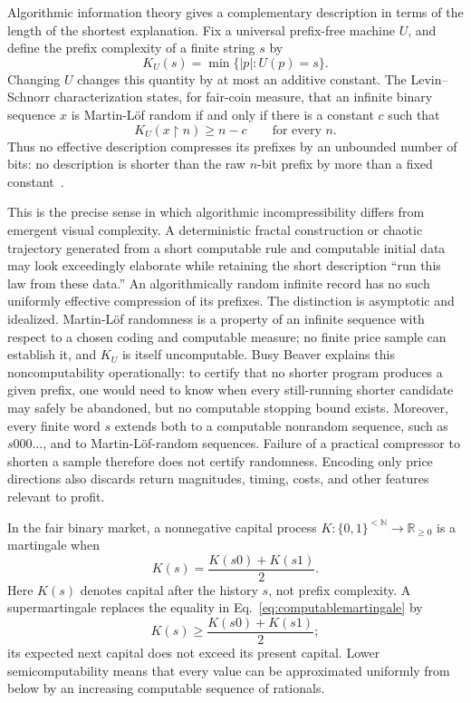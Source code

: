 \documentclass[aps,pra,reprint,superscriptaddress,amsmath,amssymb,floatfix]{revtex4-2}
\theoremstyle{plain}
\theoremstyle{definition}
\theoremstyle{remark}
\begin{document}
Algorithmic information theory gives a complementary description in terms of
the length of the shortest explanation. Fix a universal prefix-free machine
\(U\), and define the prefix complexity of a finite string \(s\) by
\begin{equation}
  K_U(s)=\min\{|p|:U(p)=s\}.
  \label{eq:prefixcomplexity}
\end{equation}
Changing \(U\) changes this quantity by at most an additive constant. The
Levin--Schnorr characterization states, for fair-coin measure, that an infinite
binary sequence \(x\) is Martin-L\"of random if and only if there is a constant
\(c\) such that
\begin{equation}
  K_U(x{\upharpoonright}n)\geq n-c
  \qquad\text{for every }n.
  \label{eq:levinschnorr}
\end{equation}
Thus no effective description compresses its prefixes by an unbounded number
of bits: no description is shorter than the raw \(n\)-bit prefix by more than
a fixed constant~\cite{Chaitin-1974,calude:02,Nies2009}.

This is the precise sense in which algorithmic incompressibility differs from
emergent visual complexity. A deterministic fractal construction or chaotic
trajectory generated from a short computable rule and computable initial data
may look exceedingly elaborate while retaining the short description ``run
this law from these data.'' An algorithmically random infinite record has no
such uniformly effective compression of its prefixes. The distinction is
asymptotic and idealized. Martin-L\"of randomness is a property of an infinite
sequence with respect to a chosen coding and computable measure; no finite
price sample can establish it, and \(K_U\) is itself uncomputable. Busy Beaver
explains this noncomputability operationally: to certify that no shorter
program produces a given prefix, one would need to know when every still-running
shorter candidate may safely be abandoned, but no computable stopping bound
exists. Moreover, every finite word \(s\) extends both to a computable
nonrandom sequence, such as \(s000\ldots\), and to Martin-L\"of-random
sequences. Failure of a practical compressor to shorten a sample therefore
does not certify randomness. Encoding only price directions also discards
return magnitudes, timing, costs, and other features relevant to profit.

In the fair binary market, a nonnegative capital process
\(K\colon\{0,1\}^{<\mathbb{N}}\to\mathbb{R}_{\geq0}\) is a martingale when
\begin{equation}
  K(s)=\frac{K(s0)+K(s1)}2.
  \label{eq:computablemartingale}
\end{equation}
Here \(K(s)\) denotes capital after the history \(s\), not prefix complexity.
A supermartingale replaces the equality in
Eq.~\eqref{eq:computablemartingale} by
\[
  K(s)\geq\frac{K(s0)+K(s1)}2;
\]
its expected next capital does not exceed its present capital. Lower
semicomputability means that every value can be approximated uniformly from
below by an increasing computable sequence of rationals.
\end{document}
